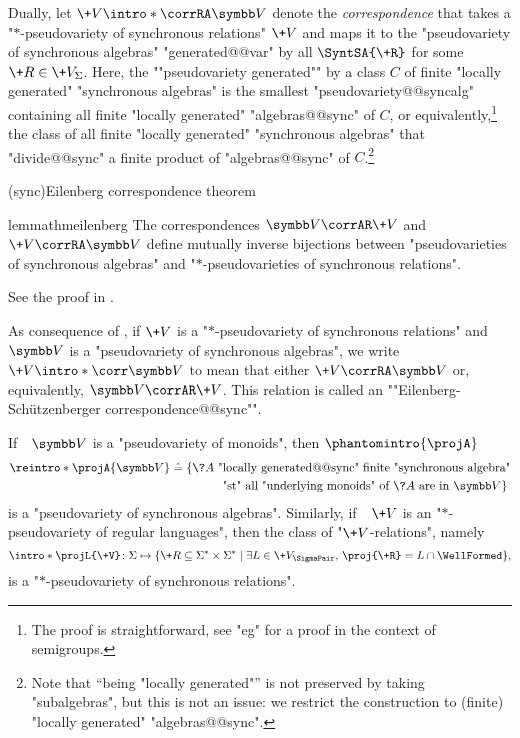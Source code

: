 Dually, let \AP$\+V \intro*\corrRA \B{V}$ denote the \emph{correspondence} that takes
a "$\ast$-pseudo\-variety of synchronous relations" $\+V$
and maps it to the "pseudovariety of synchronous algebras" "generated@@var" by
all $\SyntSA{\+R}$ for some $\+R \in \+V_{\Sigma}$.
Here, the ""pseudovariety generated"" by a class $C$
of finite "locally generated" "synchronous algebras"
is the smallest "pseudovariety@@syncalg" containing
all finite "locally generated" "algebras@@sync" of $C$,
or equivalently,\footnote{The proof is straightforward,
see "eg" \cite[Proposition XI.1.1, p.~190]{pin_mathematical_2022} for a proof in the context of semigroups.} the class of all finite "locally generated" "synchronous algebras" 
that "divide@@sync" a finite product of "algebras@@sync" of $C$.\footnote{Note that ``being "locally generated"'' is not preserved by taking "subalgebras", but this is not an issue: we restrict the construction to (finite) "locally generated" "algebras@@sync".}

\AP{}(sync){Eilenberg correspondence theorem}\vspace{-1em}
\begin{restatable}{lemma}{thmeilenberg}
	\AP\label{lem:eilenberg-sy}
	The correspondences $\B{V} \corrAR \+V$ and $\+V \corrRA \B{V}$ define
	mutually inverse bijections between "pseudovarieties of
	synchronous algebras" and "$\ast$-pseudovarieties of synchronous relations".
\end{restatable}
See the proof in .

As consequence of , if
$\+V$ is a "$\ast$-pseudovariety of synchronous relations"
and $\B{V}$ is a "pseudovariety of synchronous algebras",
we write \AP$\+V \intro*\corr \B{V}$
to mean that either $\+V \corrRA \B{V}$ or, equivalently, $\B{V} \corrAR \+V$.
This relation is called an \AP""Eilenberg-Schützenberger correspondence@@sync"".

\begin{proposition}
	If~~$\B{V}$ is a "pseudovariety of monoids", then \AP$\phantomintro{\projA}$
	\begin{align*}
		\reintro*\projA{\B{V}} & \defeq
		\{\?A \text{ "locally generated@@sync" finite "synchronous algebra"} \\
		& \qquad\qquad \text{ "st" all "underlying monoids" of $\?A$ are in $\B{V}$}\}
	\end{align*}
	is a "pseudovariety of synchronous algebras". Similarly,
	if~~$\+V$ is an "$\ast$-pseudovariety of regular languages", then
	the class of "$\+V$-relations", namely
	\[
		\intro*\projL{\+V} \colon
		\Sigma \mapsto \{\+R \subseteq \Sigma^* \times \Sigma^* \mid \exists L \in \+V_{\SigmaPair},\, \proj{\+R} = L \cap \WellFormed \},
	\]
	is a "$\ast$-pseudovariety of synchronous relations".
\end{proposition}

